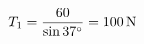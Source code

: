 \documentclass[preview]{standalone}
\begin{document}
\begin{align*}
\special{dvisvgm:raw <g id='unique000'>}T_1 = \frac{60}{\sin 37^{\circ}} = 100\,\mathrm{N}\special{dvisvgm:raw </g>}
\end{align*}
\end{document}
